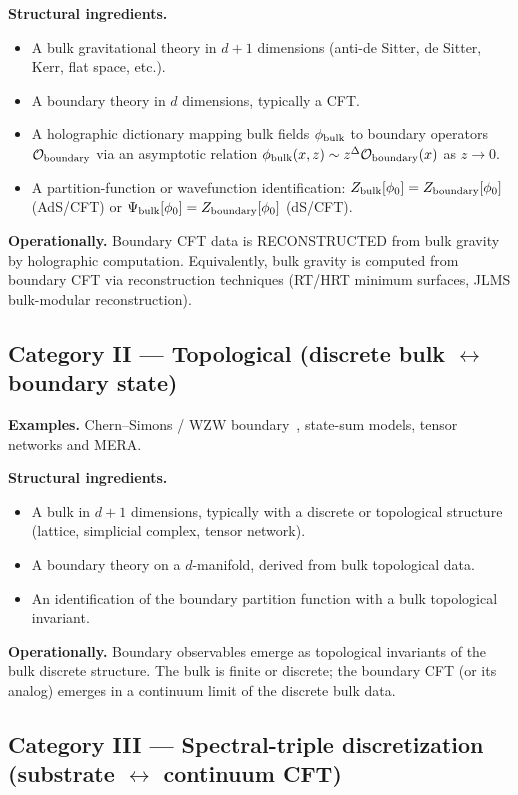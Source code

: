 \documentclass[11pt,a4paper]{article}
\theoremstyle{plain}
\theoremstyle{definition}
\begin{document}
\textbf{Structural ingredients.}
\begin{itemize}
\item A bulk gravitational theory in $d + 1$ dimensions (anti-de
Sitter, de Sitter, Kerr, flat space, etc.).
\item A boundary theory in $d$ dimensions, typically a CFT.
\item A holographic dictionary mapping bulk fields $\phi_{\rm bulk}$ to
boundary operators $\mathcal{O}_{\rm boundary}$ via an asymptotic
relation $\phi_{\rm bulk}(x, z) \sim z^{\Delta}\mathcal{O}_{\rm boundary}(x)$
as $z \to 0$.
\item A partition-function or wavefunction identification:
$Z_{\rm bulk}[\phi_{0}] = Z_{\rm boundary}[\phi_{0}]$ (AdS/CFT) or
$\Psi_{\rm bulk}[\phi_{0}] = Z_{\rm boundary}[\phi_{0}]$ (dS/CFT).
\end{itemize}

\textbf{Operationally.} Boundary CFT data is RECONSTRUCTED from bulk
gravity by holographic computation. Equivalently, bulk gravity is
computed from boundary CFT via reconstruction techniques (RT/HRT
minimum surfaces, JLMS bulk-modular reconstruction).

\subsection{Category II --- Topological (discrete bulk $\leftrightarrow$ boundary state)}

\textbf{Examples.} Chern--Simons / WZW boundary~\cite{witten1989},
state-sum models, tensor networks and MERA.

\textbf{Structural ingredients.}
\begin{itemize}
\item A bulk in $d + 1$ dimensions, typically with a discrete or
topological structure (lattice, simplicial complex, tensor network).
\item A boundary theory on a $d$-manifold, derived from bulk
topological data.
\item An identification of the boundary partition function with a
bulk topological invariant.
\end{itemize}

\textbf{Operationally.} Boundary observables emerge as topological
invariants of the bulk discrete structure. The bulk is finite or
discrete; the boundary CFT (or its analog) emerges in a continuum
limit of the discrete bulk data.

\subsection{Category III --- Spectral-triple discretization (substrate $\leftrightarrow$ continuum CFT)}
\end{document}
